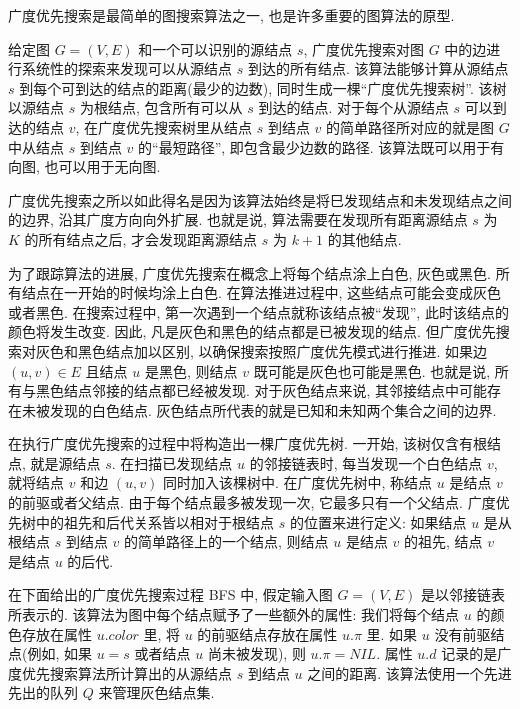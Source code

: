 \documentclass[oneside,10pt,fontset=none]{ctexbook}
\numberwithin{definition}{chapter}
\numberwithin{theorem}{chapter}
\numberwithin{lemma}{chapter}
\begin{document}
广度优先搜索是最简单的图搜索算法之一, 也是许多重要的图算法的原型.

给定图 $G=(V,E)$ 和一个可以识别的源结点 $s$, 广度优先搜索对图 $G$ 中的边进行系统性的探索来发现可以从源结点 $s$ 到达的所有结点. 该算法能够计算从源结点 $s$ 到每个可到达的结点的距离(最少的边数), 同时生成一棵``广度优先搜索树''. 该树以源结点 $s$ 为根结点, 包含所有可以从 $s$ 到达的结点. 对于每个从源结点 $s$ 可以到达的结点 $v$, 在广度优先搜索树里从结点 $s$ 到结点 $v$ 的简单路径所对应的就是图 $G$ 中从结点 $s$ 到结点 $v$ 的``最短路径'', 即包含最少边数的路径. 该算法既可以用于有向图, 也可以用于无向图.

广度优先搜索之所以如此得名是因为该算法始终是将巳发现结点和未发现结点之间的边界, 沿其广度方向向外扩展. 也就是说, 算法需要在发现所有距离源结点 $s$ 为 $K$ 的所有结点之后, 才会发现距离源结点 $s$ 为 $k+1$ 的其他结点.

为了跟踪算法的进展, 广度优先搜索在概念上将每个结点涂上白色, 灰色或黑色. 所有结点在一开始的时候均涂上白色. 在算法推进过程中, 这些结点可能会变成灰色或者黑色. 在搜索过程中, 第一次遇到一个结点就称该结点被``发现'', 此时该结点的颜色将发生改变. 因此, 凡是灰色和黑色的结点都是已被发现的结点. 但广度优先搜索对灰色和黑色结点加以区别, 以确保搜索按照广度优先模式进行推进. 如果边 $(u,v) \in E$ 且结点 $u$ 是黑色, 则结点 $v$ 既可能是灰色也可能是黑色. 也就是说, 所有与黑色结点邻接的结点都已经被发现. 对于灰色结点来说, 其邻接结点中可能存在未被发现的白色结点. 灰色结点所代表的就是已知和未知两个集合之间的边界.

在执行广度优先搜索的过程中将构造出一棵广度优先树. 一开始, 该树仅含有根结点, 就是源结点 $s$. 在扫描已发现结点 $u$ 的邻接链表时, 每当发现一个白色结点 $v$, 就将结点 $v$ 和边 $(u,v)$ 同时加入该棵树中. 在广度优先树中, 称结点 $u$ 是结点 $v$ 的前驱或者父结点. 由于每个结点最多被发现一次, 它最多只有一个父结点. 广度优先树中的祖先和后代关系皆以相对于根结点 $s$ 的位置来进行定义: 如果结点 $u$ 是从根结点 $s$ 到结点 $v$ 的简单路径上的一个结点, 则结点 $u$ 是结点 $v$ 的祖先, 结点 $v$ 是结点 $u$ 的后代.

在下面给出的广度优先搜索过程 BFS 中, 假定输入图 $G=(V,E)$ 是以邻接链表所表示的. 该算法为图中每个结点赋予了一些额外的属性: 我们将每个结点 $u$ 的颜色存放在属性 $u.color$ 里, 将 $u$ 的前驱结点存放在属性 $u.\pi$ 里. 如果 $u$ 没有前驱结点(例如, 如果 $u=s$ 或者结点 $u$ 尚未被发现), 则 $u.\pi=NIL$. 属性 $u.d$ 记录的是广度优先搜索算法所计算出的从源结点 $s$ 到结点 $u$ 之间的距离. 该算法使用一个先进先出的队列 $Q$ 来管理灰色结点集.
\end{document}
